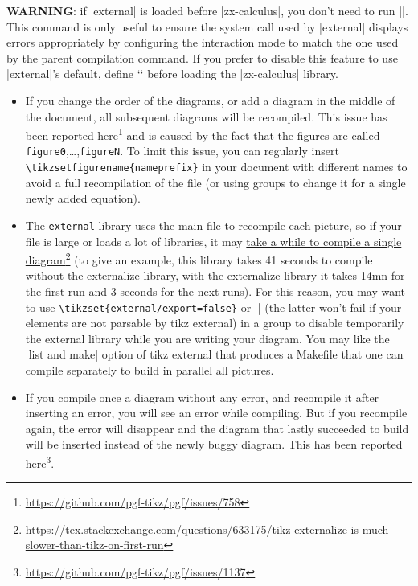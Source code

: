 \documentclass[a4paper,doc2]{ltxdoc} %
\newcommand{\mylink}[2]{\href{#1}{#2}\footnote{\url{#1}}}
\begin{document}
{\textbf{WARNING}: if |external| is loaded before |zx-calculus|, you don't need to run |\zxConfigureExternalSystemCallAuto|. This command is only useful to ensure the system call used by |external| displays errors appropriately by configuring the interaction mode to match the one used by the parent compilation command. If you prefer to disable this feature to use |external|'s default, define `\def\zxDoNotPatchSystemCall{}` before loading the |zx-calculus| library.

\begin{itemize}
\item If you change the order of the diagrams, or add a diagram in the middle of the document, all subsequent diagrams will be recompiled. This issue has been reported \mylink{https://github.com/pgf-tikz/pgf/issues/758}{here} and is caused by the fact that the figures are called \texttt{figure0},\dots,\texttt{figureN}. To limit this issue, you can regularly insert \texttt{\textbackslash{}tikzsetfigurename\{nameprefix\}} in your document with different names to avoid a full recompilation of the file (or using groups to change it for a single newly added equation).
\item The \texttt{external} library uses the main file to recompile each picture, so if your file is large or loads a lot of libraries, it may \mylink{https://tex.stackexchange.com/questions/633175/tikz-externalize-is-much-slower-than-tikz-on-first-run}{take a while to compile a single diagram} (to give an example, this library takes 41 seconds to compile without the externalize library, with the externalize library it takes 14mn for the first run and 3 seconds for the next runs). For this reason, you may want to use \texttt{\textbackslash{}tikzset\{external/export=false\}} or |\tikzexternaldisable| (the latter won't fail if your elements are not parsable by tikz external) in a group to disable temporarily the external library while you are writing your diagram. You may like the |list and make| option of tikz external that produces a Makefile that one can compile separately to build in parallel all pictures.
\item If you compile once a diagram without any error, and recompile it after inserting an error, you will see an error while compiling. But if you recompile again, the error will disappear and the diagram that lastly succeeded to build will be inserted instead of the newly buggy diagram. This has been reported \mylink{https://github.com/pgf-tikz/pgf/issues/1137}{here}.

\end{itemize}}
\end{document}

